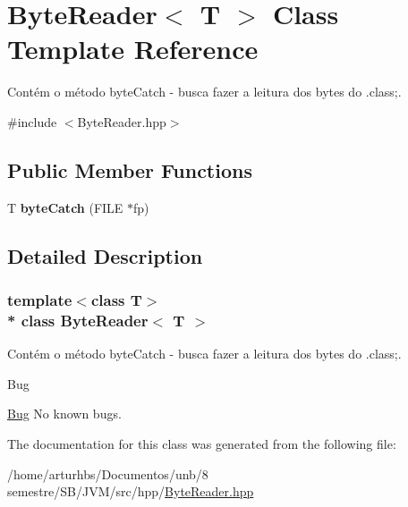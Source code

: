\hypertarget{classByteReader}{}\section{Byte\+Reader$<$ T $>$ Class Template Reference}
\label{classByteReader}


Contém o método byte\+Catch -\/ busca fazer a leitura dos bytes do .class;.  




{\ttfamily \#include $<$Byte\+Reader.\+hpp$>$}

\subsection*{Public Member Functions}
\begin{DoxyCompactItemize}
\item 
T {\bfseries byte\+Catch} (F\+I\+LE $\ast$fp)\hypertarget{classByteReader_ae570748805994596f51ae033183935d7}{}\label{classByteReader_ae570748805994596f51ae033183935d7}

\end{DoxyCompactItemize}


\subsection{Detailed Description}
\subsubsection*{template$<$class T$>$\\*
class Byte\+Reader$<$ T $>$}

Contém o método byte\+Catch -\/ busca fazer a leitura dos bytes do .class;. 

\begin{DoxyRefDesc}{Bug}
\item[\hyperlink{bug__bug000015}{Bug}]No known bugs. \end{DoxyRefDesc}


The documentation for this class was generated from the following file\+:\begin{DoxyCompactItemize}
\item 
/home/arturhbs/\+Documentos/unb/8 semestre/\+S\+B/\+J\+V\+M/src/hpp/\hyperlink{ByteReader_8hpp}{Byte\+Reader.\+hpp}\end{DoxyCompactItemize}
